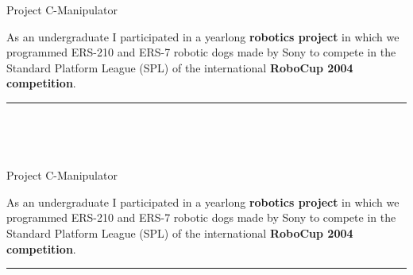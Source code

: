 \begin{frame}{Project C-Manipulator }

\justifying

As an undergraduate I participated in a yearlong {\bf robotics project} in which
we programmed ERS-210 and ERS-7 robotic dogs made by Sony to compete in the 
Standard Platform League (SPL) of the international {\bf RoboCup 2004 competition}.

\vspace{2em}


\vspace{1em}

\begin{center}
\rule{2cm}{0.4pt}\\[0.5em]
\end{center}

\\[1em]
\end{frame}



\begin{frame}{Project C-Manipulator }

\justifying

As an undergraduate I participated in a yearlong {\bf robotics project} in which
we programmed ERS-210 and ERS-7 robotic dogs made by Sony to compete in the 
Standard Platform League (SPL) of the international {\bf RoboCup 2004 competition}.

\vspace{2em}


\vspace{1em}

\begin{center}
\rule{2cm}{0.4pt}\\[0.5em]
\end{center}

\end{frame}

